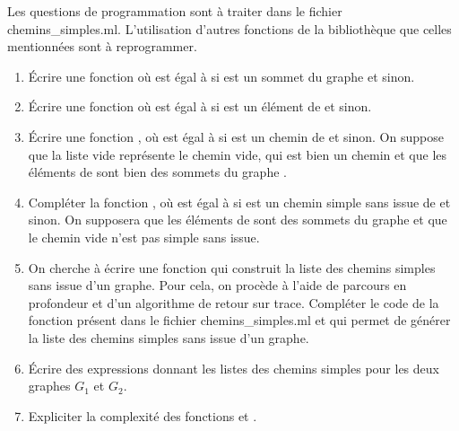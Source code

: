\documentclass[a4paper, 11pt]{article}
\begin{document}
Les questions de programmation sont à traiter dans le fichier \textsf{chemins\_simples.ml}. L'utilisation d'autres fonctions de la bibliothèque que celles mentionnées sont à reprogrammer.

\begin{enumerate}
    \item \'Ecrire une fonction  où  est égal à  si  est un sommet du graphe  et  sinon.
    \item \'Ecrire une fonction  où   est égal à  si  est un élément de  et  sinon.
    \item \'Ecrire une fonction , où  est égal à  si  est un chemin de  et  sinon. On suppose que la liste vide représente le chemin vide, qui est bien un chemin et que les éléments de  sont bien des sommets du graphe .
    \item Compléter la fonction , où  est égal à  si  est un chemin simple sans issue de  et  sinon.  On supposera que les éléments de  sont des sommets du graphe  et que le chemin vide n'est pas simple sans issue.
    \item  On cherche à écrire une fonction qui construit la liste des chemins simples sans issue
        d'un graphe. Pour cela, on procède à l'aide de parcours en profondeur et d'un algorithme
        de retour sur trace. Compléter le code de la fonction 
        présent dans le fichier \textsf{chemins\_simples.ml} et qui permet de générer la liste des chemins simples sans issue d'un graphe.
    \item \'Ecrire des expressions donnant les listes des chemins simples pour les deux graphes $G_1$ et  $G_2$.
    \item Expliciter la complexité des fonctions  et .
 \end{enumerate}
\end{document}
